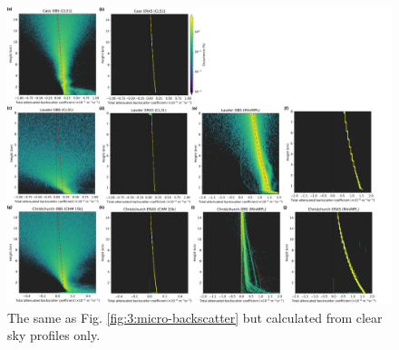 \begin{figure}[p]
\centering
\includegraphics[width=\textwidth]{chapter3/fig/backscatter_hist_micro_clear.png}
\caption{
The same as Fig. \ref{fig:3:micro-backscatter} but calculated from clear
sky profiles only.
}
\label{fig:3:micro-backscatter-clear}
\end{figure}

